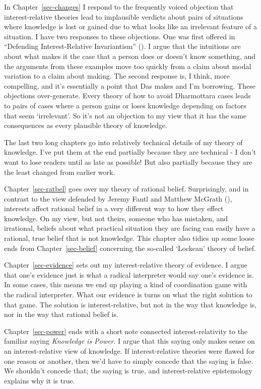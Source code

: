 \documentclass[
  10pt,
  letterpaper,
  twoside]{scrbook}
\begin{document}
In Chapter~\ref{sec-changes} I respond to the frequently voiced
objection that interest-relative theories lead to implausible verdicts
about pairs of situations where knowledge is lost or gained due to what
looks like an irrelevant feature of a situation. I have two responses to
these objections. One was first offered in ``Defending Interest-Relative
Invariantism'' ().
I argue that the intuitions are about what makes it the case that a
person does or doesn't know something, and the arguments from these
examples move too quickly from a claim about modal variation to a claim
about making. The second response is, I think, more compelling, and it's
essentially a point that Das makes and I'm borrowing. These objections
over-generate. Every theory of how to avoid Dharmottara cases leads to
pairs of cases where a person gains or loses knowledge depending on
factors that seem `irrelevant'. So it's not an objection to my view that
it has the same consequences as every plausible theory of knowledge.

The last two long chapters go into relatively technical details of my
theory of knowledge. I've put them at the end partially because they are
technical - I don't want to lose readers until as late as possible! But
also partially because they are the least changed from earlier work.

Chapter~\ref{sec-ratbel} goes over my theory of rational belief.
Surprisingly, and in contrast to the view defended by Jeremy Fantl and
Matthew McGrath (), interests
affect rational belief in a very different way to how they effect
knowledge. On my view, but not theirs, someone who has mistaken, and
irrational, beliefs about what practical situation they are facing can
easily have a rational, true belief that is not knowledge. This chapter
also tidies up some loose ends from Chapter~\ref{sec-belief} concerning
the so-called `Lockean' theory of belief.

Chapter~\ref{sec-evidence} sets out my interest-relative theory of
evidence. I argue that one's evidence just is what a radical interpreter
would say one's evidence is. In some cases, this means we end up playing
a kind of coordination game with the radical interpreter. What our
evidence is turns on what the right solution to that game. The solution
is interest-relative, but not in the way that knowledge is, nor in the
way that rational belief is.

Chapter~\ref{sec-power} ends with a short note connected
interest-relativity to the familiar saying \emph{Knowledge is Power}. I
argue that this saying only makes sense on an interest-relative view of
knowledge. If interest-relative theories were flawed for one reason or
another, then we'd have to simply concede that the saying is false. We
shouldn't concede that; the saying is true, and interest-relative
epistemology explains why it is true.
\end{document}
